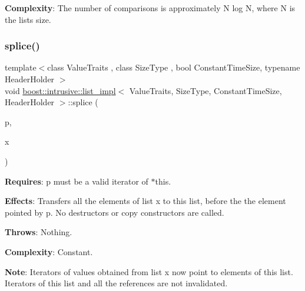 {\bfseries Complexity}\+: The number of comparisons is approximately N log N, where N is the list\textquotesingle{}s size. \mbox{\label{classboost_1_1intrusive_1_1list__impl_a458f433ae6990732b006544cb26f3cf2}} 
\subsubsection{\texorpdfstring{splice()}{splice()}\hspace{0.1cm}{\footnotesize\ttfamily [1/4]}}
{\footnotesize\ttfamily template$<$class Value\+Traits , class Size\+Type , bool Constant\+Time\+Size, typename Header\+Holder $>$ \\
void \hyperlink{classboost_1_1intrusive_1_1list__impl}{boost\+::intrusive\+::list\+\_\+impl}$<$ Value\+Traits, Size\+Type, Constant\+Time\+Size, Header\+Holder $>$\+::splice (\begin{DoxyParamCaption}\item[{const\+\_\+iterator}]{p,  }\item[{\hyperlink{classboost_1_1intrusive_1_1list__impl}{list\+\_\+impl}$<$ Value\+Traits, Size\+Type, Constant\+Time\+Size, Header\+Holder $>$ \&}]{x }\end{DoxyParamCaption})\hspace{0.3cm}{\ttfamily [inline]}}

{\bfseries Requires}\+: p must be a valid iterator of $\ast$this.

{\bfseries Effects}\+: Transfers all the elements of list x to this list, before the the element pointed by p. No destructors or copy constructors are called.

{\bfseries Throws}\+: Nothing.

{\bfseries Complexity}\+: Constant.

{\bfseries Note}\+: Iterators of values obtained from list x now point to elements of this list. Iterators of this list and all the references are not invalidated. \mbox{\label{classboost_1_1intrusive_1_1list__impl_a7d78b95611893de6779df06307a7ccb0}} 
